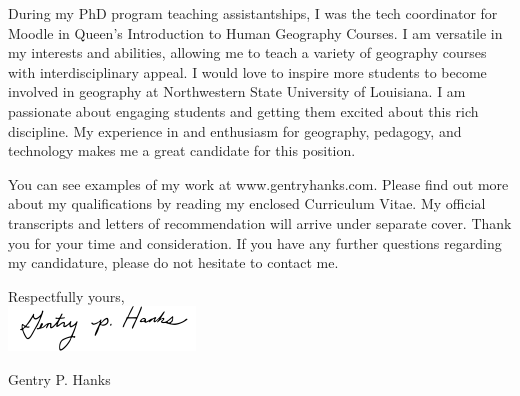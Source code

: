 \documentclass[10pt,a4paper]{letter}
\begin{document}
\begin{letter}
During my PhD program teaching assistantships, I was the tech coordinator for Moodle in Queen's Introduction to Human Geography Courses. I am versatile in my interests and abilities, allowing me to teach a variety of geography courses with interdisciplinary appeal. I would love to inspire more students to become involved in geography at Northwestern State University of Louisiana. I am passionate about engaging students and getting them excited about this rich discipline. My experience in and enthusiasm for geography, pedagogy, and technology makes me a great candidate for this position.

  
You can see examples of my work at www.gentryhanks.com. Please find out more about my qualifications by reading my enclosed Curriculum Vitae. My official transcripts and letters of recommendation will arrive under separate cover. Thank you for your time and consideration. If you have any further questions regarding my candidature, please do not hesitate to contact me.

Respectfully yours,\\
\includegraphics[scale=1]{Hankssig.png}

Gentry P. Hanks

  \end{letter} 
  
\end{document}
